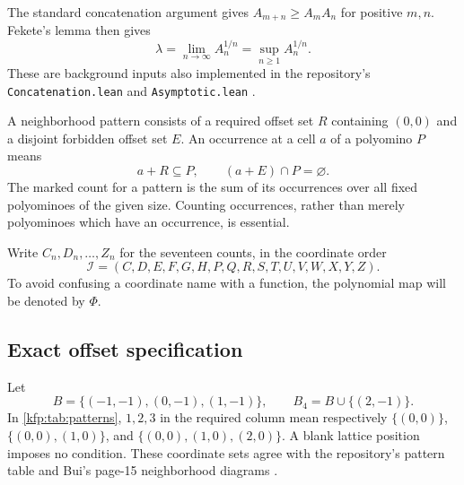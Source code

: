 \documentclass[11pt,a4paper]{article}
\theoremstyle{definition}
\theoremstyle{remark}
\begin{document}
The standard concatenation argument gives $A_{m+n}\geq A_mA_n$ for positive
$m,n$. Fekete's lemma then gives
\begin{equation}\label{kfp:eq:lambda}
 \lambda=\lim_{n\to\infty}A_n^{1/n}=\sup_{n\geq1}A_n^{1/n}.
\end{equation}
These are background inputs also implemented in the repository's
\texttt{Concatenation.lean} and \texttt{Asymptotic.lean}
\cite{bui,reporeadme,repocomplete}.

A neighborhood pattern consists of a required offset set $R$ containing
$(0,0)$ and a disjoint forbidden offset set $E$. An occurrence at a cell $a$
of a polyomino $P$ means
\[
 a+R\subseteq P,\qquad (a+E)\cap P=\varnothing.
\]
The marked count for a pattern is the sum of its occurrences over all fixed
polyominoes of the given size. Counting occurrences, rather than merely
polyominoes which have an occurrence, is essential.

Write $C_n,D_n,\ldots,Z_n$ for the seventeen counts, in the coordinate order
\begin{equation}\label{kfp:eq:order}
 \mathcal I=(C,D,E,F,G,H,P,Q,R,S,T,U,V,W,X,Y,Z).
\end{equation}
To avoid confusing a coordinate name with a function, the polynomial map
will be denoted by $\Phi$.

\subsection{Exact offset specification}
Let
\[
 B=\{(-1,-1),(0,-1),(1,-1)\},\qquad
 B_4=B\cup\{(2,-1)\}.
\]
In \cref{kfp:tab:patterns}, $1,2,3$ in the required column mean respectively
$\{(0,0)\}$, $\{(0,0),(1,0)\}$, and
$\{(0,0),(1,0),(2,0)\}$. A blank lattice position imposes no condition.
These coordinate sets agree with the repository's pattern table and Bui's
page-15 neighborhood diagrams \cite{repopatterns,bui}.
\end{document}
